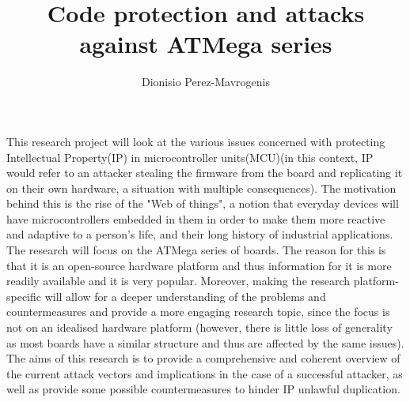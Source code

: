 \documentclass[12pt,a4paper,onecolumn]{article}
\author{Dionisio Perez-Mavrogenis}
\title{Code protection and attacks against ATMega series}
\begin{document}
\maketitle
\vspace{1.5cm}

This research project will look at the various issues concerned with protecting Intellectual Property(IP) in microcontroller units(MCU)(in this context, IP would refer to an attacker stealing the firmware from the board and replicating it on their own hardware, a situation with multiple consequences). The motivation behind this is the rise of the "Web of things", a notion that everyday devices will have microcontrollers embedded in them in order to make them more reactive and adaptive to a person's life, and their long history of industrial applications.\\

The research will focus on the ATMega series of boards. The reason for this is that it is an open-source hardware platform and thus information for it is more readily available and it is very popular. Moreover, making the research platform-specific will allow for a deeper understanding of the problems and countermeasures and provide a more engaging research topic, since the focus is not on an idealised hardware platform (however, there is little loss of generality as most boards have a similar structure and thus are affected by the same issues).\\

The aims of this research is to provide a comprehensive and coherent overview of the current attack vectors and implications in the case of a successful attacker, as well as provide some possible countermeasures to hinder IP unlawful duplication.
\end{document}
